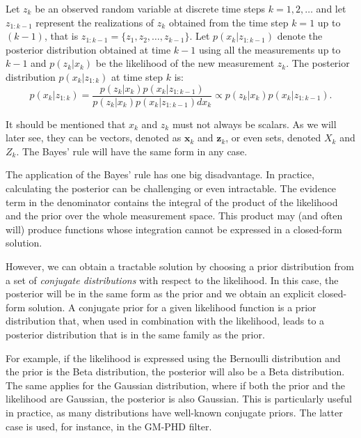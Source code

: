 \begin{theorem}
    Let $z_k$ be an observed random variable at discrete time steps
    $k = 1, 2, \ldots$ and let $z_{1:k-1}$ represent the realizations of $z_k$ 
    obtained from the time step $k = 1$ up to $(k-1)$, that is $z_{1:k-1} = 
    \{z_1, z_2,\ldots, z_{k-1}\}$. Let $p(x_k | z_{1:k-1})$ denote the posterior 
    distribution obtained at time $k-1$ using all the measurements up to $k-1$ 
    and $p(z_k | x_k)$ be the likelihood of the new measurement $z_k$. The 
    posterior distribution $p(x_k | z_{1:k})$ at time step $k$ is:
    $$
    p(x_k | z_{1:k}) 
        = \frac
            { p(z_k | x_k) p(x_k | z_{1:k-1}) }
            { p(z_k | x_k) p(x_k | z_{1:k-1}) dx_k }
        \propto p(z_k | x_k) p(x_k | z_{1:k-1}).
    $$
\end{theorem}

It should be mentioned that $x_k$ and $z_k$ must not always be scalars. As we
will later see, they can be vectors, denoted as $\mathbf{x}_k$ and 
$\mathbf{z}_k$, or even sets, denoted $X_k$ and $Z_k$. The Bayes' rule will
have the same form in any case.

The application of the Bayes' rule has one big disadvantage. In practice, 
calculating the posterior can be challenging or even intractable. The evidence 
term in the denominator contains the integral of the product of the likelihood 
and the prior over the whole measurement space. This product may (and often 
will) produce functions whose integration cannot be expressed in a closed-form 
solution.

However, we can obtain a tractable solution by choosing a prior distribution 
from a set of \textit{conjugate distributions} with respect to the likelihood. 
In this case, the posterior will be in the same form as the prior and we obtain 
an explicit closed-form solution. A conjugate prior for a given likelihood 
function is a prior distribution that, when used in combination with the 
likelihood, leads to a posterior distribution that is in the same family as the 
prior.

For example, if the likelihood is expressed using the Bernoulli distribution 
and the prior is the Beta distribution, the posterior will also be a Beta 
distribution. The same applies for the Gaussian distribution, where if both the 
prior and the likelihood are Gaussian, the posterior is also Gaussian. This is 
particularly useful in practice, as many distributions have well-known 
conjugate priors. The latter case is used, for instance, in the GM-PHD filter.
